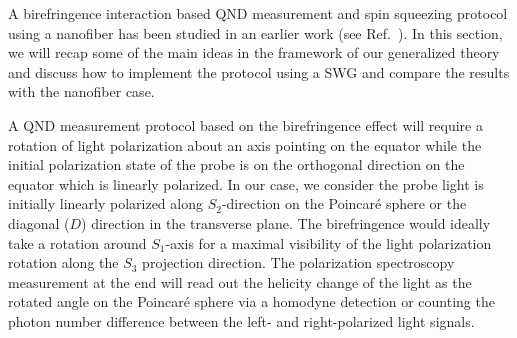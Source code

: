 \documentclass[aps,pra,twocolumn,superscriptaddress]{revtex4-1} %
\newcommand{\Poincare}{Poincar\'e\xspace}
\begin{document}
A birefringence interaction based QND measurement and spin squeezing protocol using a nanofiber has been studied in an earlier work (see Ref.~\cite{Qi2016}). 
In this section, we will recap some of the main ideas in the framework of our generalized theory and discuss how to implement the protocol using a SWG and compare the results with the nanofiber case.

A QND measurement protocol based on the birefringence effect will require a rotation of light polarization about an axis pointing on the equator while the initial polarization state of the probe is on the orthogonal direction on the equator which is linearly polarized. 
In our case, we consider the probe light is initially linearly polarized along $ S_2 $-direction on the \Poincare sphere or the diagonal ($ D $) direction in the transverse plane. 
The birefringence would ideally take a rotation around $ S_1 $-axis for a maximal visibility of the light polarization rotation along the $ S_3 $ projection direction.
The polarization spectroscopy measurement at the end will read out the helicity change of the light as the rotated angle on the \Poincare sphere via a homodyne detection or counting the photon number difference between the left- and right-polarized light signals.
\end{document}
